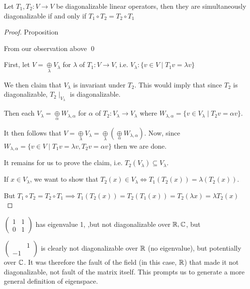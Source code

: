 \begin{proposition}
    Let \(T_1, T_2: V \to V\) be diagonalizable linear operators, then they are simultaneously diagonalizable if and only if \(T_1 \circ T_2 = T_2 \circ T_1\)
\end{proposition}

\begin{proof} {Proposition}

    \pffwd From our observation above \qed

    \pfbwd First, let \(V  = \underset{\lambda}{\oplus} V_{\lambda}\) for \(\lambda\) of \(T_1: V \to V\), i.e. \(V_\lambda: \{v \in V \mid T_1 v = \lambda v\}\)

    We then claim that \(V_\lambda\) is invariant under \(T_2\). This would imply that since \(T_2\) is diagonalizable, \(T_2 \mid_{V_\lambda}\) is diagonalizable.

    Then each \(V_\lambda = \underset{\alpha}{\oplus} W_{\lambda, \alpha}\) for \(\alpha\) of \(T_2: V_\lambda \to V_\lambda\) where \(W_{\lambda, \alpha} = \{v \in V_\lambda \mid T_2 v= \alpha v\}\).

    It then follows that \(V = \underset{\lambda}{\oplus} V_{\lambda} = \underset{\lambda}{\oplus} (\underset{\alpha}{\oplus} W_{\lambda, \alpha})\). Now, since \(W_{\lambda, \alpha} = \{v \in V \mid T_1 v = \lambda v, T_2 v = \alpha v\}\) then we are done.

    It remains for us to prove the claim, i.e. \(T_2(V_\lambda) \subseteq V_\lambda\).

    If \(x \in V_\lambda\), we want to show that \(T_2(x) \in V_\lambda \Leftrightarrow T_1(T_2(x))  = \lambda (T_2(x))\).

    But \(T_1 \circ T_2 = T_2 \circ T_1 \implies T_1(T_2(x)) = T_2(T_1(x)) = T_2(\lambda x) = \lambda T_2(x)\)
\end{proof}

\begin{observe}
    \(\begin{pmatrix}
        1 & 1 \\
        0 & 1
    \end{pmatrix}\) has eigenvalue 1, ,but not diagonalizable over \(\mathbb{R}, \mathbb{C}\), but

    \(\begin{pmatrix}
           & 1 \\
        -1 &
    \end{pmatrix}\) is clearly not diagonalizable over \(\mathbb{R}\) (no eigenvalue), but potentially over \(\mathbb{C}\). It was therefore the fault of the field (in this case, \(\mathbb{R}\)) that made it not diagonalizable, not fault of the matrix itself. This prompts us to generate a more general definition of eigenspace.
\end{observe}

